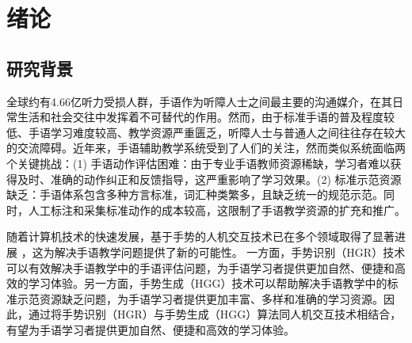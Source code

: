
\chapter{绪论}
\label{sec:intro}

\section{研究背景}
全球约有4.66亿听力受损人群，手语作为听障人士之间最主要的沟通媒介，在其日常生活和社会交往中发挥着不可替代的作用。然而，由于标准手语的普及程度较低、手语学习难度较高、教学资源严重匮乏，听障人士与普通人之间往往存在较大的交流障碍。近年来，手语辅助教学系统受到了人们的关注，然而类似系统面临两个关键挑战：(1) 手语动作评估困难：由于专业手语教师资源稀缺，学习者难以获得及时、准确的动作纠正和反馈指导，这严重影响了学习效果。(2) 标准示范资源缺乏：手语体系包含多种方言标准，词汇种类繁多，且缺乏统一的规范示范。同时，人工标注和采集标准动作的成本较高，这限制了手语教学资源的扩充和推广。

随着计算机技术的快速发展，基于手势的人机交互技术已在多个领域取得了显著进展 \cite{伍杰2019基于视觉的实时手势识别方法研究, desai2017human,strickland2013using}，这为解决手语教学问题提供了新的可能性。
一方面，手势识别（HGR）技术可以有效解决手语教学中的手语评估问题，为手语学习者提供更加自然、便捷和高效的学习体验。另一方面，手势生成（HGG）技术可以帮助解决手语教学中的标准示范资源缺乏问题，为手语学习者提供更加丰富、多样和准确的学习资源。因此，通过将手势识别（HGR）与手势生成（HGG）算法同人机交互技术相结合，有望为手语学习者提供更加自然、便捷和高效的学习体验。

